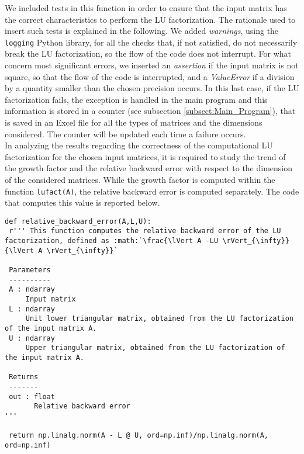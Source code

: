 \documentclass[a4paper,11pt]{article}
\begin{document}
\noindent We included tests in this function in order to ensure that the input matrix has the correct characteristics to perform the LU factorization. The rationale used to insert such tests is explained in the following. We added \textit{warnings}, using the \texttt{logging} Python library, for all the checks that, if not satisfied, do not necessarily break the LU factorization, so the flow of the code does not interrupt.
For what concern most significant errors, we inserted an \textit{assertion} if the input matrix is not square, so that the flow of the code is interrupted, and a \textit{ValueError} if a division by a quantity smaller than the chosen precision occurs. In this last case, if the LU factorization fails, the exception is handled in the main program and this information is stored in a counter (see subsection \ref{subsect:Main_Program}), that is saved in an Excel file for all the types of matrices and the dimensions considered. The counter will be updated each time a failure occurs.\\

\noindent In analyzing the results regarding the correctness of the computational LU factorization for the chosen input matrices, it is required to study the trend of the growth factor and the relative backward error with respect to the dimension of the considered matrices. While the growth factor is computed within the function \texttt{lufact(A)}, the relative backward error is computed separately. The code that computes this value is reported below.

\begin{verbatim}
def relative_backward_error(A,L,U):
 r''' This function computes the relative backward error of the LU factorization, defined as :math:`\frac{\lVert A -LU \rVert_{\infty}}{\lVert A \rVert_{\infty}}`

 Parameters
 ----------
 A : ndarray
     Input matrix
 L : ndarray
     Unit lower triangular matrix, obtained from the LU factorization of the input matrix A.
 U : ndarray
     Upper triangular matrix, obtained from the LU factorization of the input matrix A.

 Returns
 -------
 out : float
       Relative backward error
'''

 return np.linalg.norm(A - L @ U, ord=np.inf)/np.linalg.norm(A, ord=np.inf)
\end{verbatim}
\end{document}
